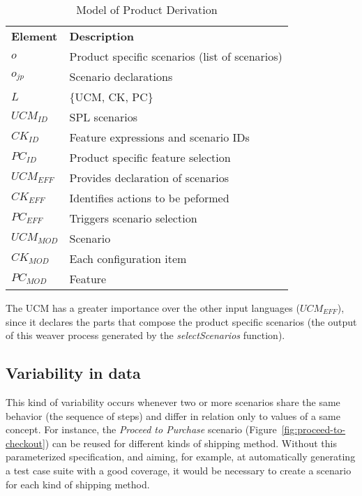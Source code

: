 \begin{table}[htb]
\begin{center}
\caption{Model of Product Derivation} \label{tab:vf-weaver}
\begin{tabular}{p{0.6in}p{2.4in}}
   \hline\noalign{\smallskip}
  {\bf Element} & {\bf Description} \\
   \noalign{\smallskip}
   \hline
   \noalign{\smallskip}
   $o$              & Product specific scenarios (list of scenarios) \\
   $o_{jp}$        	& Scenario declarations \\
   $L$              & \{UCM, CK, PC\} \\
   $UCM_{ID}$ 		& SPL scenarios \\
   $CK_{ID}$    	& Feature expressions and scenario IDs\\
   $PC_{ID}$    	& Product specific feature selection \\
   $UCM_{EFF}$ 		& Provides declaration of scenarios \\
   $CK_{EFF}$    	& Identifies actions to be peformed  \\
   $PC_{EFF}$    	& Triggers scenario selection \\
   $UCM_{MOD}$ 		& Scenario \\
   $CK_{MOD}$    	& Each configuration item  \\
   $PC_{MOD}$    	& Feature \\
  \hline
  \end{tabular}
\end{center}
\end{table}

The UCM has a greater importance over the other input languages ($UCM_{EFF}$),
since it declares the parts that compose the product specific scenarios (the
output of this weaver process generated by the \emph{selectScenarios} function).

\subsection{Variability in data}\label{sub:bind-weaver}

This kind of variability occurs whenever two or more scenarios share the same
behavior (the sequence of steps) and differ in relation only to values of a same
concept. For instance, the \emph{Proceed to Purchase} scenario
(Figure~\ref{fig:proceed-to-checkout}) can be reused for different kinds
of shipping method. Without this parameterized specification, and aiming, for
example, at automatically generating a test case suite with a good coverage, it
would be necessary to create a scenario for each kind of shipping method.


